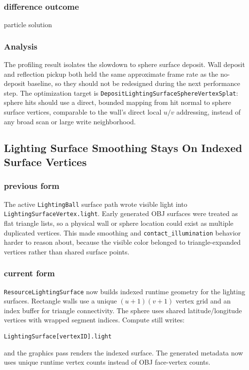 \subsubsection{difference outcome}

particle solution

\subsubsection{Analysis}

The profiling result isolates the slowdown to sphere surface deposit.  Wall
deposit and reflection pickup both held the same approximate frame rate as
the no-deposit baseline, so they should not be redesigned during the next
performance step.  The optimization target is
\texttt{DepositLightingSurfaceSphereVertexSplat}: sphere hits should use a
direct, bounded mapping from hit normal to sphere surface vertices, comparable
to the wall's direct local \(u/v\) addressing, instead of any broad scan or
large write neighborhood.

\subsection{Lighting Surface Smoothing Stays On Indexed Surface Vertices}

\subsubsection{previous form}

The active \texttt{LightingBall} surface path wrote visible light into
\texttt{LightingSurfaceVertex.light}.  Early generated OBJ surfaces were
treated as flat triangle lists, so a physical wall or sphere location could
exist as multiple duplicated vertices.  This made smoothing and
\texttt{contact\_illumination} behavior harder to reason about, because the
visible color belonged to triangle-expanded vertices rather than shared
surface points.

\subsubsection{current form}

\texttt{ResourceLightingSurface} now builds indexed runtime geometry for the
lighting surfaces.  Rectangle walls use a unique \((u+1)(v+1)\) vertex grid
and an index buffer for triangle connectivity.  The sphere uses shared
latitude/longitude vertices with wrapped segment indices.  Compute still
writes:
\begin{verbatim}
LightingSurface[vertexID].light
\end{verbatim}
and the graphics pass renders the indexed surface.  The generated metadata now
uses unique runtime vertex counts instead of OBJ face-vertex counts.

